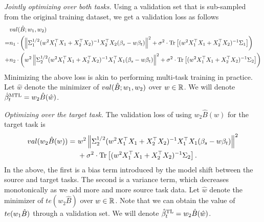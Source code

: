 \medskip
\noindent\textit{Jointly optimizing over both tasks.}
Using a validation set that is sub-sampled from the original training dataset, we get a validation loss as follows
\begin{align}
		&val(\hat{B}; w_1, w_2) \nonumber\\
	=& n_1 \cdot \left({\left\| \Sigma_1^{1/2}(w^2 X_1^{\top}X_1 + X_2^{\top}X_2)^{-1}X_2^{\top}X_2(\beta_s - w\beta_t) \right\|^2 + \sigma^2 \cdot \operatorname{Tr}\left[(w^2 X_1^{\top}X_1 + X_2^{\top}X_2)^{-1}\Sigma_1\right]}\right) \nonumber \\
	+& n_2 \cdot \left({w^2\left\| \Sigma_2^{1/2}(w^2 X_1^{\top}X_1 + X_2^{\top}X_2)^{-1}X_1^{\top}X_1(\beta_s - w\beta_t) \right\|^2 + \sigma^2 \cdot \operatorname{Tr}\left[(w^2 X_1^{\top}X_1 + X_2^{\top}X_2)^{-1}\Sigma_2\right]}\right) \label{eq_val_mtl}
\end{align}
Minimizing the above loss is akin to performing multi-task training in practice.
Let $\hat{w}$ denote the minimizer of $val(\hat{B}; w_1, w_2)$ over $w\in\mathbb{R}$.
We will denote $\hat{\beta}_t^{\text{MTL}} = w_{2}\hat{B}(\hat{w})$.

\medskip
\noindent\textit{Optimizing over the target task.} The validation loss of using $w_2 \hat{B}(w)$ for the target task is
\begin{align}
	val(w_2\hat{B}(w)) =&~ w^2 \left\| \Sigma_2^{1/2}(w^2 X_1^{\top}X_1 + X_2^{\top}X_2)^{-1} X_1^{\top}X_1 (\beta_s - w \beta_t) \right\|^2 \nonumber \\
			&~ + \sigma^2 \cdot \operatorname{Tr}\left[(w^2 X_1^{\top}X_1 + X_2^{\top}X_2)^{-1} \Sigma_2\right]. \label{eq_te_mtl}
\end{align}
In the above, the first is a bias term introduced by the model shift between the source and target tasks.
The second is a variance term, which decreases monotonically as we add more and more source task data.
Let $\hat{w}$ denote the minimizer of $te(w_2 \hat{B})$ over $w\in\mathbb{R}$.
Note that we can obtain the value of $te(w_1\hat{B})$ through a validation set.
We will denote $\hat{\beta}_t^{\text{TL}} = w_2 \hat{B}(\hat{w})$.


